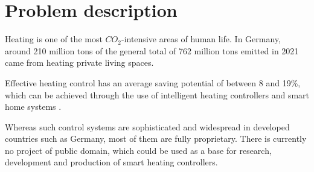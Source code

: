 %
%

\chapter{Problem description}
\label{chap:Introduction}
%
Heating is one of the most $CO_2$-intensive areas of human life. In Germany, around 210 million tons of the general total of 762 million tons emitted in 2021 came from heating private living spaces. \cite{StatistischesBundesamt.16.07.2025} \cite{Umweltbundesamt.13.10.2025}

Effective heating control has an average saving potential of between 8 and 19\%, which can be achieved through the use of intelligent heating controllers and smart home systems \cite{Kersken.2018}. 

Whereas such control systems are sophisticated and widespread in developed countries such as Germany, most of them are fully proprietary. There is currently no project of public domain, which could be used as a base for research, development and production of smart heating controllers.